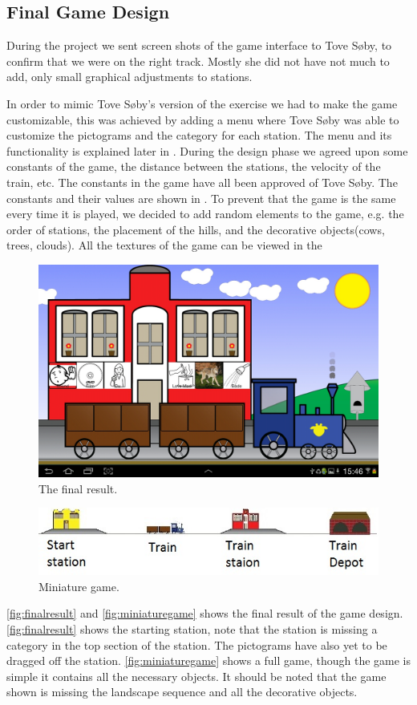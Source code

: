 \subsection{Final Game Design}\label{sec:designgameinterface}

During the project we sent screen shots of the game interface to Tove Søby, to confirm that we were on the right track. Mostly she did not have not much to add, only small graphical adjustments to stations.

In order to mimic Tove Søby's version of the exercise we had to make the game customizable, this was achieved by adding a menu where Tove Søby was able to customize the pictograms and the category for each station. The menu and its functionality is explained later in .
During the design phase we agreed upon some constants of the game, the distance between the stations, the velocity of the train, etc. The constants in the game have all been approved of Tove Søby. The constants and their values are shown in .
To prevent that the game is the same every time it is played, we decided to add random elements to the game, e.g. the order of stations, the placement of the hills, and the decorative objects(cows, trees, clouds). 
All the textures of the game can be viewed in the 
\begin{figure}[H]
\centering
\includegraphics[width=0.9\linewidth]{img/screenshots/gamedesign1.jpg}
\caption{The final result.}
\label{fig:finalresult}
\end{figure}
\begin{figure}[H]
\centering
\includegraphics[width=0.9\linewidth]{img/screenshots/stations.jpg}
\caption{Miniature game.}
\label{fig:miniaturegame}
\end{figure}
\autoref{fig:finalresult} and \autoref{fig:miniaturegame} shows the final result of the game design. \autoref{fig:finalresult} shows the starting station, note that the station is missing a category in the top section of the station. The pictograms have also yet to be dragged off the station.
\autoref{fig:miniaturegame} shows a full game, though the game is simple it contains all the necessary objects. It should be noted that the game shown is missing the landscape sequence and all the decorative objects.

